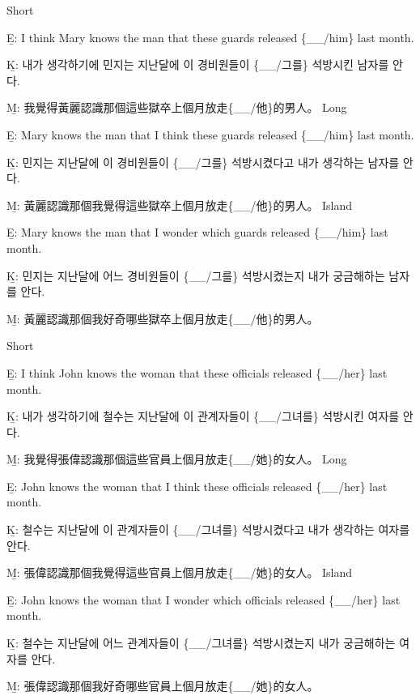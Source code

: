 \pex %
\a Short\par\nobreak
\beginsubsub
\b{E:} I think Mary knows the man that these guards released \{\_\_/him\} last month.\par\nobreak
\b{K:} \ko 내가 생각하기에 민지는 지난달에 이 경비원들이 \{\_\_/그를\} 석방시킨 남자를 안다. \normalfont\par\nobreak
\b{M:} \zh 我覺得黃麗認識那個這些獄卒上個月放走\{\_\_/他\}的男人。 \normalfont
\endsubsub
\a Long\par\nobreak
\beginsubsub
\b{E:} Mary knows the man that I think these guards released \{\_\_/him\} last month.\par\nobreak
\b{K:} \ko 민지는 지난달에 이 경비원들이 \{\_\_/그를\} 석방시켰다고 내가 생각하는 남자를 안다. \normalfont\par\nobreak
\b{M:} \zh 黃麗認識那個我覺得這些獄卒上個月放走\{\_\_/他\}的男人。 \normalfont
\endsubsub
\a Island\par\nobreak
\beginsubsub
\b{E:} Mary knows the man that I wonder which guards released \{\_\_/him\} last month.\par\nobreak
\b{K:} \ko 민지는 지난달에 어느 경비원들이 \{\_\_/그를\} 석방시켰는지 내가 궁금해하는 남자를 안다\normalfont.\par\nobreak
\b{M:} \zh 黃麗認識那個我好奇哪些獄卒上個月放走\{\_\_/他\}的男人。\normalfont
\endsubsub
\xe

\pex %
\a Short\par\nobreak
\beginsubsub
\b{E:} I think John knows the woman that these officials released \{\_\_/her\} last month.\par\nobreak
\b{K:} \ko 내가 생각하기에 철수는 지난달에 이 관계자들이 \{\_\_/그녀를\} 석방시킨 여자를 안다. \normalfont\par\nobreak
\b{M:} \zh 我覺得張偉認識那個這些官員上個月放走\{\_\_/她\}的女人。 \normalfont
\endsubsub
\a Long\par\nobreak
\beginsubsub
\b{E:} John knows the woman that I think these officials released \{\_\_/her\} last month.\par\nobreak
\b{K:} \ko 철수는 지난달에 이 관계자들이 \{\_\_/그녀를\} 석방시켰다고 내가 생각하는 여자를 안다. \normalfont\par\nobreak
\b{M:} \zh 張偉認識那個我覺得這些官員上個月放走\{\_\_/她\}的女人。 \normalfont
\endsubsub
\a Island\par\nobreak
\beginsubsub
\b{E:} John knows the woman that I wonder which officials released \{\_\_/her\} last month.\par\nobreak
\b{K:} \ko 철수는 지난달에 어느 관계자들이 \{\_\_/그녀를\} 석방시켰는지 내가 궁금해하는 여자를 안다\normalfont.\par\nobreak
\b{M:} \zh 張偉認識那個我好奇哪些官員上個月放走\{\_\_/她\}的女人。\normalfont
\endsubsub
\xe

